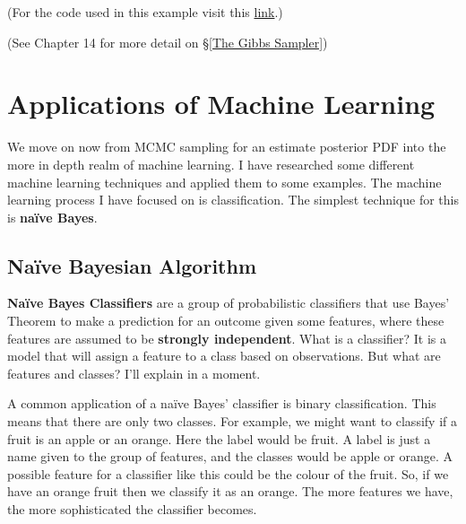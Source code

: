 \documentclass[12pt,twoside]{report}   %
\newcommand{\bb}{\textbf}
\begin{document}
(For the code used in this example visit this \href{https://github.com/iMikeT/MathProject2/tree/master/R%20Code/Gibbs/Bayesian%20Network%20Example}{link}.)

(See \cite{3} Chapter 14 for more detail on \S\ref{The Gibbs Sampler})

\chapter{Applications of Machine Learning}\label{Applications of Machine Learning}

We move on now from MCMC sampling for an estimate posterior PDF into the more in depth realm of machine learning. I have researched some different machine learning techniques and applied them to some examples. The machine learning process I have focused on is classification. The simplest technique for this is \bb{na\"{i}ve Bayes}.

\section{Na\"{i}ve Bayesian Algorithm}\label{Naive Bayesian Algorithm}
\vspace{-0.4in}
\underline{\hspace{6.2in}}
\vspace{-0.1in}

\bb{Na\"{i}ve Bayes Classifiers} are a group of probabilistic classifiers that use Bayes' Theorem to make a prediction for an outcome given some features, where these features are assumed to be \bb{strongly independent}. What is a classifier? It is a model that will assign a feature to a class based on observations. But what are features and classes? I'll explain in a moment.

A common application of a na\"{i}ve Bayes' classifier is binary classification. This means that there are only two classes. For example, we might want to classify if a fruit is an apple or an orange. Here the label would be fruit. A label is just a name given to the group of features, and the classes would be apple or orange. A possible feature for a classifier like this could be the colour of the fruit. So, if we have an orange fruit then we classify it as an orange. The more features we have, the more sophisticated the classifier becomes.
\end{document}
